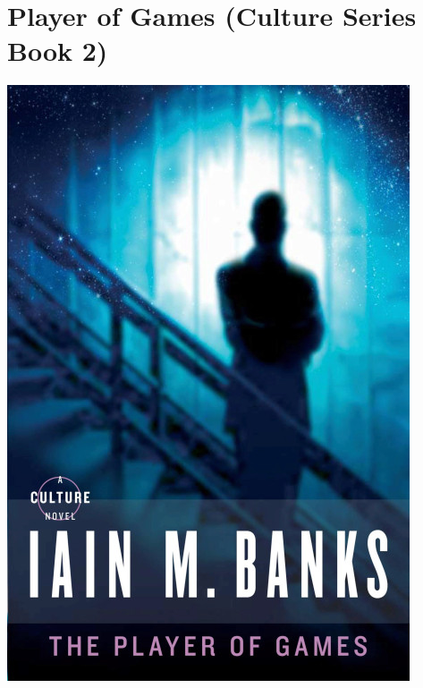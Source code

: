 \documentclass{tufte-handout}
\makeatletter
\newcommand{\varcaption}[2][0pt]{%
  \gsetlength{\@tufte@caption@vertical@offset}{-#1}%
  \gdef\@tufte@stored@varcaption{#2}%
}
\gdef\@tufte@stored@varcaption{} %
\makeatother
\begin{document}
\section*{Player of Games (Culture Series Book 2)}
\begin{marginfigure}[1\baselineskip]
   \includegraphics[width=\linewidth]{images/player_of_games.jpg}
   \varcaption{\href{https://www.hachettebookgroup.com/titles/iain-m-banks/the-player-of-games/9780316005401/}{Publisher Link}, \href{https://www.amazon.com/Player-Games-Culture-Iain-Banks/dp/0316005401/}{Amazon Link}}
\end{marginfigure}
\end{document}

